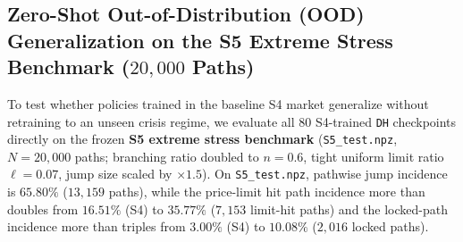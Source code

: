 \documentclass[11pt,a4paper]{article}
\begin{document}
\subsection{Zero-Shot Out-of-Distribution (OOD) Generalization on the S5 Extreme Stress Benchmark ($20,000$ Paths)}
\label{sec:s5_stress}
To test whether policies trained in the baseline S4 market generalize without retraining to an unseen crisis regime, we evaluate all 80 S4-trained \texttt{DH} checkpoints directly on the frozen \textbf{S5 extreme stress benchmark} (\texttt{S5\_test.npz}, $N = 20,000$ paths; branching ratio doubled to $n = 0.6$, tight uniform limit ratio $\ell = 0.07$, jump size scaled by $\times 1.5$). On \texttt{S5\_test.npz}, pathwise jump incidence is $65.80\%$ ($13,159$ paths), while the price-limit hit path incidence more than doubles from $16.51\%$ (S4) to $35.77\%$ ($7,153$ limit-hit paths) and the locked-path incidence more than triples from $3.00\%$ (S4) to $10.08\%$ ($2,016$ locked paths).
\end{document}
